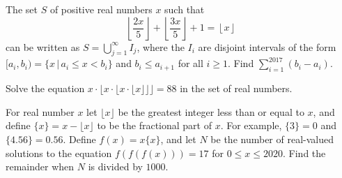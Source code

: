 \documentclass{article}
\begin{document}
\begin{prob}[CMIMC 2017]{9}
The set $S$ of positive real numbers $x$ such that 
	\[ \left\lfloor\frac{2x}{5}\right\rfloor + \left\lfloor\frac{3x}{5}\right\rfloor + 1 = \left\lfloor x\right\rfloor \]
	can be written as $S = \bigcup_{j = 1}^{\infty} I_{j}$, where the $I_{i}$ are disjoint intervals of the form $[a_{i}, b_{i}) = \{x \, | \, a_i \leq x < b_i\}$ and $b_{i} \leq a_{i+1}$ for all $i \geq 1$. Find $\sum_{i=1}^{2017} (b_{i} - a_{i})$.
\end{prob}

\begin{prob}{9}
Solve the equation $x\cdot  \lfloor x\cdot \lfloor x \cdot \lfloor x \rfloor \rfloor \rfloor = 88$ in the set of real numbers.
\end{prob}

\begin{prob}[AIME II/2020/14]{9}
For real number $x$ let $\lfloor x\rfloor$ be the greatest integer less than or equal to $x$, and define $\{x\} = x - \lfloor x \rfloor$ to be the fractional part of $x$. For example, $\{3\} = 0$ and $\{4.56\} = 0.56$. Define $f(x)=x\{x\}$, and let $N$ be the number of real-valued solutions to the equation $f(f(f(x)))=17$ for $0\leq x\leq 2020$. Find the remainder when $N$ is divided by $1000$.
\end{prob}
\end{document}
